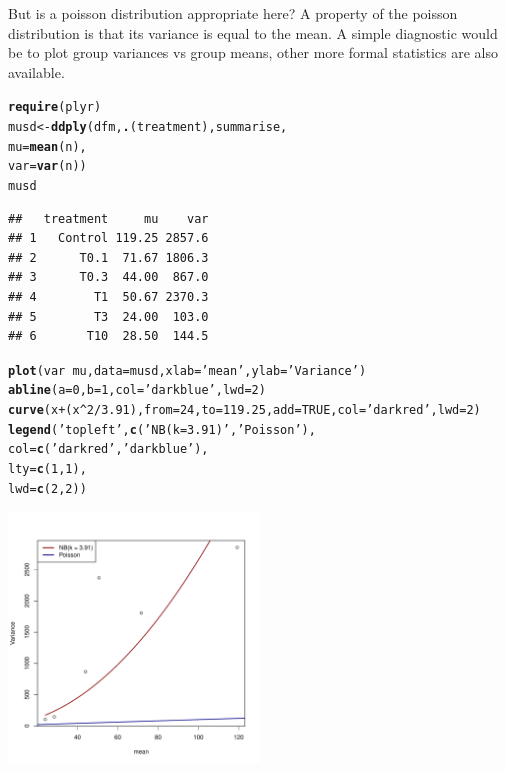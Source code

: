 \documentclass{scrartcl}\usepackage[]{graphicx}\usepackage[]{color}
\makeatletter
\newcommand{\hlnum}[1]{\textcolor[rgb]{0.686,0.059,0.569}{#1}}%
\newcommand{\hlstr}[1]{\textcolor[rgb]{0.192,0.494,0.8}{#1}}%
\newcommand{\hlopt}[1]{\textcolor[rgb]{0,0,0}{#1}}%
\newcommand{\hlstd}[1]{\textcolor[rgb]{0.345,0.345,0.345}{#1}}%
\newcommand{\hlkwb}[1]{\textcolor[rgb]{0.69,0.353,0.396}{#1}}%
\newcommand{\hlkwc}[1]{\textcolor[rgb]{0.333,0.667,0.333}{#1}}%
\newcommand{\hlkwd}[1]{\textcolor[rgb]{0.737,0.353,0.396}{\textbf{#1}}}%
\newenvironment{kframe}{%
 \def\at@end@of@kframe{}%
 \ifinner\ifhmode%
  \def\at@end@of@kframe{\end{minipage}}%
  \begin{minipage}{\columnwidth}%
 \fi\fi%
 \def\FrameCommand##1{\hskip\@totalleftmargin \hskip-\fboxsep
 \colorbox{shadecolor}{##1}\hskip-\fboxsep
     \hskip-\linewidth \hskip-\@totalleftmargin \hskip\columnwidth}%
 \MakeFramed {\advance\hsize-\width
   \@totalleftmargin\z@ \linewidth\hsize
   \@setminipage}}%
 {\par\unskip\endMakeFramed%
 \at@end@of@kframe}
\newenvironment{knitrout}{}{} %
\makeatother
\begin{document}
But is a poisson distribution appropriate here? 
A property of the poisson distribution is that its variance is equal to the mean. A simple diagnostic would be to plot group variances vs group means, other more formal statistics are also available.


\begin{knitrout}
\color{fgcolor}\begin{kframe}
\begin{alltt}
\hlkwd{require}\hlstd{(plyr)}
\hlstd{musd} \hlkwb{<-} \hlkwd{ddply}\hlstd{(dfm,} \hlkwd{.}\hlstd{(treatment), summarise,}
              \hlkwc{mu} \hlstd{=} \hlkwd{mean}\hlstd{(n),}
              \hlkwc{var} \hlstd{=} \hlkwd{var}\hlstd{(n))}
\hlstd{musd}
\end{alltt}
\begin{verbatim}
##   treatment     mu    var
## 1   Control 119.25 2857.6
## 2      T0.1  71.67 1806.3
## 3      T0.3  44.00  867.0
## 4        T1  50.67 2370.3
## 5        T3  24.00  103.0
## 6       T10  28.50  144.5
\end{verbatim}
\begin{alltt}
\hlkwd{plot}\hlstd{(var} \hlopt{~} \hlstd{mu,} \hlkwc{data} \hlstd{= musd,} \hlkwc{xlab} \hlstd{=} \hlstr{'mean'}\hlstd{,} \hlkwc{ylab} \hlstd{=} \hlstr{'Variance'}\hlstd{)}
\hlkwd{abline}\hlstd{(}\hlkwc{a} \hlstd{=} \hlnum{0}\hlstd{,} \hlkwc{b} \hlstd{=} \hlnum{1}\hlstd{,} \hlkwc{col} \hlstd{=} \hlstr{'darkblue'}\hlstd{,} \hlkwc{lwd} \hlstd{=} \hlnum{2}\hlstd{)}
\hlkwd{curve}\hlstd{(x} \hlopt{+} \hlstd{(x}\hlopt{^}\hlnum{2} \hlopt{/} \hlnum{3.91}\hlstd{),} \hlkwc{from} \hlstd{=} \hlnum{24}\hlstd{,} \hlkwc{to} \hlstd{=} \hlnum{119.25}\hlstd{,} \hlkwc{add} \hlstd{=} \hlnum{TRUE}\hlstd{,} \hlkwc{col} \hlstd{=} \hlstr{'darkred'}\hlstd{,} \hlkwc{lwd} \hlstd{=} \hlnum{2}\hlstd{)}
\hlkwd{legend}\hlstd{(}\hlstr{'topleft'}\hlstd{,} \hlkwd{c}\hlstd{(}\hlstr{'NB(k = 3.91)'}\hlstd{,} \hlstr{'Poisson'}\hlstd{),}
       \hlkwc{col} \hlstd{=} \hlkwd{c}\hlstd{(}\hlstr{'darkred'}\hlstd{,} \hlstr{'darkblue'}\hlstd{),}
       \hlkwc{lty} \hlstd{=} \hlkwd{c}\hlstd{(}\hlnum{1}\hlstd{,}\hlnum{1}\hlstd{),}
       \hlkwc{lwd} \hlstd{=} \hlkwd{c}\hlstd{(}\hlnum{2}\hlstd{,}\hlnum{2}\hlstd{))}
\end{alltt}
\end{kframe}
\includegraphics[width=0.5\textwidth]{figure/mod_count_meanvar} 

\end{knitrout}
\end{document}
